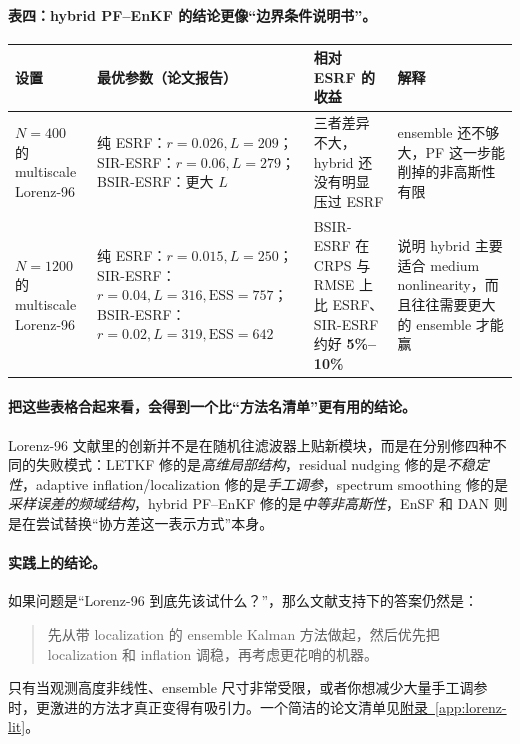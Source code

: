 \documentclass[12pt,a4paper]{ctexart}
\begin{document}
\paragraph{表四：hybrid PF--EnKF 的结论更像“边界条件说明书”。}
\begin{center}
\small
\begin{tabular}{>{\raggedright\arraybackslash}p{3.0cm} >{\raggedright\arraybackslash}p{3.0cm} >{\raggedright\arraybackslash}p{3.7cm} >{\raggedright\arraybackslash}p{4.0cm}}
\toprule
设置 & 最优参数（论文报告） & 相对 ESRF 的收益 & 解释 \\
\midrule
\(N=400\) 的 multiscale Lorenz-96 & 纯 ESRF：\(r=0.026,L=209\)；SIR-ESRF：\(r=0.06,L=279\)；BSIR-ESRF：更大 \(L\) & 三者差异不大，hybrid 还没有明显压过 ESRF & ensemble 还不够大，PF 这一步能削掉的非高斯性有限 \\
\(N=1200\) 的 multiscale Lorenz-96 & 纯 ESRF：\(r=0.015,L=250\)；SIR-ESRF：\(r=0.04,L=316,\text{ESS}=757\)；BSIR-ESRF：\(r=0.02,L=319,\text{ESS}=642\) & BSIR-ESRF 在 CRPS 与 RMSE 上比 ESRF、SIR-ESRF 约好 \textbf{5\%--10\%} & 说明 hybrid 主要适合 medium nonlinearity，而且往往需要更大的 ensemble 才能赢 \\
\bottomrule
\end{tabular}
\end{center}

\paragraph{把这些表格合起来看，会得到一个比“方法名清单”更有用的结论。}
Lorenz-96 文献里的创新并不是在随机往滤波器上贴新模块，而是在分别修四种不同的失败模式：LETKF 修的是\emph{高维局部结构}，residual nudging 修的是\emph{不稳定性}，adaptive inflation/localization 修的是\emph{手工调参}，spectrum smoothing 修的是\emph{采样误差的频域结构}，hybrid PF--EnKF 修的是\emph{中等非高斯性}，EnSF 和 DAN 则是在尝试替换“协方差这一表示方式”本身。

\paragraph{实践上的结论。}
如果问题是“Lorenz-96 到底先该试什么？”，那么文献支持下的答案仍然是：
\begin{quote}
先从带 localization 的 ensemble Kalman 方法做起，然后优先把 localization 和 inflation 调稳，再考虑更花哨的机器。
\end{quote}

只有当观测高度非线性、ensemble 尺寸非常受限，或者你想减少大量手工调参时，更激进的方法才真正变得有吸引力。一个简洁的论文清单见\hyperref[app:lorenz-lit]{附录~\ref*{app:lorenz-lit}}。
\end{document}
